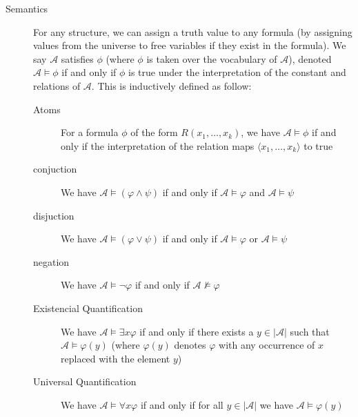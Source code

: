 \begin{description}
    \item[Semantics] For any structure, we can assign a truth value to any formula (by assigning values from the universe to free variables if they exist in the formula). We say $\mathcal{A}$ satisfies $\phi$ (where $\phi$ is taken over the vocabulary of $\mathcal{A}$), denoted $\mathcal{A} \models \phi$ if and only if $\phi$ is true under the interpretation of the constant and relations of $\mathcal{A}$. This is inductively defined as follow:
    \begin{description}
        \item[Atoms] For a formula $\phi$ of the form $R(x_1, \dots, x_k)$, we have $\mathcal{A} \models \phi$ if and only if the interpretation of the relation maps $\langle x_1, \dots, x_k \rangle$ to true
        \item[conjuction] We have $\mathcal{A} \models (\varphi \land \psi)$ if and only if $\mathcal{A} \models \varphi$ and $\mathcal{A} \models \psi$
        \item[disjuction]  We have $\mathcal{A} \models (\varphi \lor \psi)$ if and only if $\mathcal{A} \models \varphi$ or $\mathcal{A} \models \psi$
        \item[negation] We have $\mathcal{A} \models \lnot \varphi$ if and only if $\mathcal{A} \not\models \varphi$
        \item[Existencial Quantification] We have $\mathcal{A} \models \exists x\varphi$ if and only if there exists a $y \in |\mathcal{A}|$ such that $\mathcal{A} \models \varphi(y)$ (where $\varphi(y)$ denotes $\varphi$ with any occurrence of $x$ replaced with the element $y$)
        \item[Universal Quantification] We have $\mathcal{A} \models \forall x\varphi$ if and only if for all $y \in |\mathcal{A}|$ we have $\mathcal{A} \models \varphi(y)$
    \end{description}
\end{description}


